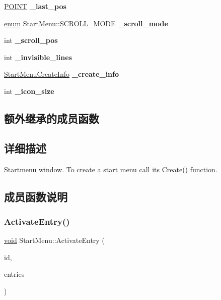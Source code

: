 \begin{DoxyCompactItemize}
\hyperlink{structtag_p_o_i_n_t}{P\+O\+I\+NT} {\bfseries \+\_\+last\+\_\+pos}
\item 
\mbox{\label{struct_start_menu_abb4432ba76859b9e81572db01a770b40}} 
\hyperlink{interfaceenum}{enum} Start\+Menu\+::\+S\+C\+R\+O\+L\+L\+\_\+\+M\+O\+DE {\bfseries \+\_\+scroll\+\_\+mode}
\item 
\mbox{\label{struct_start_menu_a75282373864c3c922c16066974aaf5d9}} 
int {\bfseries \+\_\+scroll\+\_\+pos}
\item 
\mbox{\label{struct_start_menu_a5ebced1b30d3e8134a17fa36695debb0}} 
int {\bfseries \+\_\+invisible\+\_\+lines}
\item 
\mbox{\label{struct_start_menu_a674243e63aadbca3674ae1184a440225}} 
\hyperlink{struct_start_menu_create_info}{Start\+Menu\+Create\+Info} {\bfseries \+\_\+create\+\_\+info}
\item 
\mbox{\label{struct_start_menu_a99fbdb104358d45492eb4edf20c362a2}} 
int {\bfseries \+\_\+icon\+\_\+size}
\end{DoxyCompactItemize}
\subsection*{额外继承的成员函数}


\subsection{详细描述}
Startmenu window. To create a start menu call its Create() function. 

\subsection{成员函数说明}
\mbox{\label{struct_start_menu_ac72c647cac3307a5f0b80e19ed5c155a}} 
\subsubsection{\texorpdfstring{Activate\+Entry()}{ActivateEntry()}}
{\footnotesize\ttfamily \hyperlink{interfacevoid}{void} Start\+Menu\+::\+Activate\+Entry (\begin{DoxyParamCaption}\item[{int}]{id,  }\item[{const \hyperlink{classset}{Shell\+Entry\+Set} \&}]{entries }\end{DoxyParamCaption})\hspace{0.3cm}{\ttfamily [protected]}}

